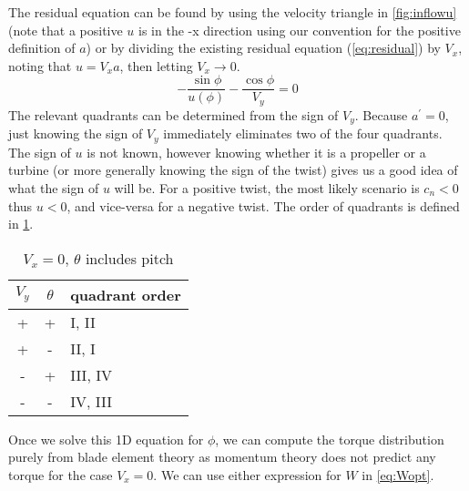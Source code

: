 The residual equation can be found by using the velocity triangle in \cref{fig:inflowu} (note that a positive $u$ is in the -x direction using our convention for the positive definition of $a$) or by dividing the existing residual equation (\cref{eq:residual}) by $V_x$, noting that $u = V_x a$, then letting $V_x \rightarrow 0$.
\begin{equation}
    - \frac{\sin\phi}{u(\phi)} - \frac{\cos\phi}{V_y} = 0
\end{equation}
The relevant quadrants can be determined from the sign of $V_y$.  Because $a^\prime = 0$, just knowing the sign of $V_y$ immediately eliminates two of the four quadrants.  The sign of $u$ is not known, however knowing whether it is a propeller or a turbine (or more generally knowing the sign of the twist) gives us a good idea of what the sign of $u$ will be.  For a positive twist, the most likely scenario is $c_n < 0$ thus $u < 0$, and vice-versa for a negative twist.  The order of quadrants is defined in \cref{tab:bracket2}.

\begin{table}[htb]
\centering
\caption{$V_x = 0$, $\theta$ includes pitch}
\label{tab:bracket2}
\begin{tabular}{@{}ccl@{}}
\toprule
$V_y$ & $\theta$ & quadrant order \\
\midrule
+ & + & I, II \\
+ & - & II, I \\
- & + & III, IV \\
- & - & IV, III \\
\bottomrule
\end{tabular}
\end{table}


Once we solve this 1D equation for $\phi$, we can compute the torque distribution purely from blade element theory as momentum theory does not predict any torque for the case $V_x = 0$. We can use either expression for $W$ in \cref{eq:Wopt}.



